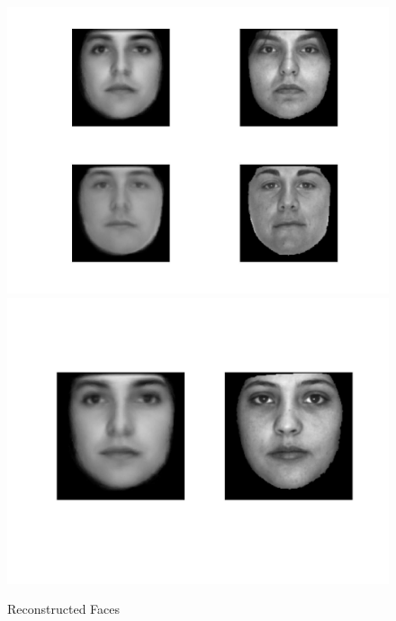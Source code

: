 \documentclass[12pt]{ctexart}
\begin{document}
\begin{enumerate}
\begin{figure}[H]
  \centering
\includegraphics[scale=0.18]{c_rec_face_wf13.jpg}
\includegraphics[scale=0.18]{c_rec_face_wf14.jpg}
  \caption{Reconstructed Faces}
\end{figure}



\end{enumerate}
\end{document}
